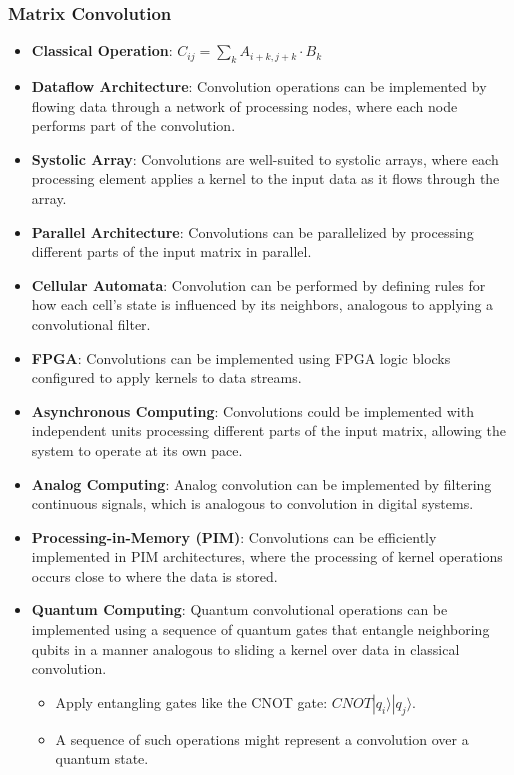 \documentclass{article}
\begin{document}
\subsubsection{Matrix Convolution}
\begin{itemize}
    \item \textbf{Classical Operation}: \( C_{ij} = \sum_k A_{i+k,j+k} \cdot B_k \)
    \item \textbf{Dataflow Architecture}: Convolution operations can be implemented by flowing data through a network of processing nodes, where each node performs part of the convolution.
    \item \textbf{Systolic Array}: Convolutions are well-suited to systolic arrays, where each processing element applies a kernel to the input data as it flows through the array.
    \item \textbf{Parallel Architecture}: Convolutions can be parallelized by processing different parts of the input matrix in parallel.
    \item \textbf{Cellular Automata}: Convolution can be performed by defining rules for how each cell’s state is influenced by its neighbors, analogous to applying a convolutional filter.
    \item \textbf{FPGA}: Convolutions can be implemented using FPGA logic blocks configured to apply kernels to data streams.
    \item \textbf{Asynchronous Computing}: Convolutions could be implemented with independent units processing different parts of the input matrix, allowing the system to operate at its own pace.
    \item \textbf{Analog Computing}: Analog convolution can be implemented by filtering continuous signals, which is analogous to convolution in digital systems.
    \item \textbf{Processing-in-Memory (PIM)}: Convolutions can be efficiently implemented in PIM architectures, where the processing of kernel operations occurs close to where the data is stored.
    \item \textbf{Quantum Computing}: Quantum convolutional operations can be implemented using a sequence of quantum gates that entangle neighboring qubits in a manner analogous to sliding a kernel over data in classical convolution. 
    \begin{itemize}
        \item Apply entangling gates like the CNOT gate: \( \textit{CNOT}|q_i\rangle|q_j\rangle \). 
        \item A sequence of such operations might represent a convolution over a quantum state.
    \end{itemize}
\end{itemize}
\end{document}
